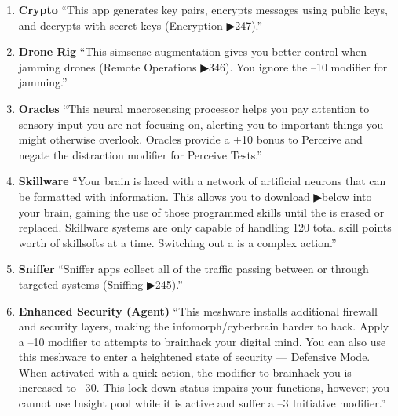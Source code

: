 \begin{enumerate}
    \item \textbf{\gls{Crypto}} “This app generates key pairs, encrypts messages using
    public keys, and decrypts with secret keys (Encryption ▶247).” \citep[pg. 326]{ep2e_1.1_2019}

    \item \textbf{\gls{Drone Rig}} “This simsense augmentation gives you better control when jamming drones (Remote Operations ▶346). You ignore the –10 modifier for jamming.” \citep[pg. 320]{ep2e_1.1_2019}

    \item \textbf{\gls{Oracles}} “This neural macrosensing processor helps you pay attention to sensory input you are not focusing on, alerting you to important things you might otherwise overlook. Oracles provide a +10 bonus to Perceive and negate the distraction modifier for Perceive Tests.” \citep[pg. 319]{ep2e_1.1_2019}


    \item \textbf{\gls{Skillware}} “Your brain is laced with a network of artificial neurons that can be formatted with information. This allows you to download  ▶below into your brain, gaining the use of those programmed skills until the  is erased or replaced. Skillware systems are only capable of handling 120 total skill points worth of skillsofts at a time. Switching out a  is a complex action.” \citep[pg. 320]{ep2e_1.1_2019}

    \item \textbf{Sniffer} “Sniffer apps collect all of the traffic passing between or through targeted systems (Sniffing ▶245).” \citep[pg. 326]{ep2e_1.1_2019}

    \item \textbf{Enhanced Security (Agent)} “This meshware installs additional firewall and security layers, making the infomorph/cyberbrain harder to hack. Apply a –10 modifier to attempts to brainhack your digital mind. You can also use this meshware to enter a heightened state of security — Defensive Mode. When activated with a quick action, the modifier to brainhack you is increased to –30. This lock-down status impairs your functions, however; you cannot use Insight pool while it is active and suffer a –3 Initiative modifier.” \citep[pg. 326]{ep2e_1.1_2019}


\end{enumerate}
